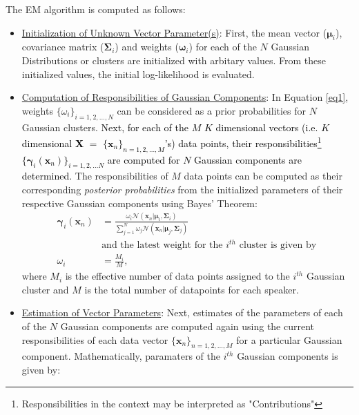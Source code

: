 \documentclass{article}
\begin{document}
{The EM algorithm is computed as follows:
\begin{itemize}
\item \underline{Initialization of Unknown Vector Parameter(s)}: First, the mean vector ($\bm\mu_i$), covariance matrix ($\bm\Sigma_i$) and weights ($\bm\omega_i$) for each of the $N$ Gaussian Distributions or clusters are initialized with arbitary values. From these initialized values, the initial log-likelihood is evaluated.
\item\underline{Computation of Responsibilities of Gaussian Components}: In Equation \eqref{eq1}, weights $\{\omega_i\}_{i=1,2,\ldots,N}$ can be considered as a prior probabilities for $N$ Gaussian clusters. \textcolor{black}{Next, for each of the $M$ $K$ dimensional vectors (i.e. $K$ dimensional $\bm X$ $=$ $\{\bm x_n\}_{n=1,2,\ldots,M}$'s) data points, their responsibilities\footnote{Responsibilities in the context may be interpreted as "Contributions"} $\{\bm\gamma_i(\bm x_n)\}_{i=1,2,\ldots N}$ are computed for $N$ Gaussian components are determined.} The responsibilities of $M$ data points can be computed as their corresponding \textit{posterior probabilities} from the initialized parameters of their respective Gaussian components using {Bayes' Theorem}:
\begin{align}
\bm\gamma_i(\bm x_n) &= \frac{\omega_i \bm{\mathcal{N}}(\bm x_n|\bm\mu_i,\bm\Sigma_i)}{\sum\limits_{j=1}^N \omega_j \bm{\mathcal{N}}(\bm x_n|\bm\mu_j,\bm\Sigma_j)}\,\\
~&\text{and the latest weight for the $i^{th}$ cluster is given by}~\nonumber\\	
\omega_i &= \frac{ M_i}{M},
\end{align}
where $ M_i$ is the effective number of data points assigned to the $i^{th}$ Gaussian cluster and $ M$ is the total number of datapoints for each speaker.
\item \underline{Estimation of Vector Parameters}: Next, estimates of the parameters of each of the $N$ Gaussian components are computed again using the current responsibilities of each data vector $\{\bm x_n\}_{n=1,2,\ldots,M}$ for a particular Gaussian component. Mathematically, paramaters of the $i^{th}$ Gaussian components is given by:


\end{itemize}}
\end{document}

